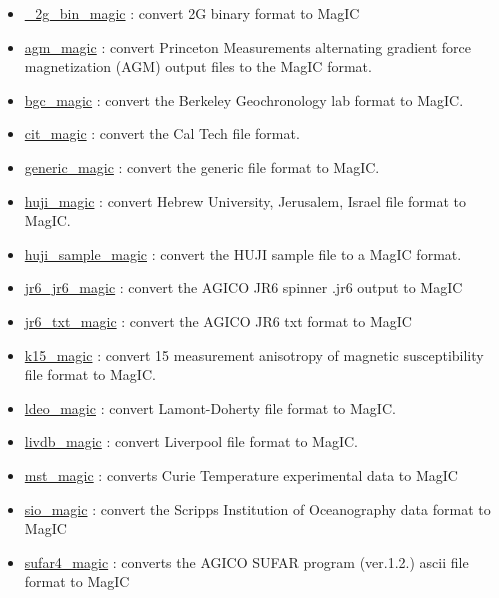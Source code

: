 \documentclass[11pt]{book}
\begin{document}
{{\begin{itemize}
\begin{itemize}
\item \href{http://pmagpy.github.io/PmagPy.html#_2g_bin_magic}{\_2g\_bin\_magic} : convert 2G binary format to MagIC
\item \href{http://pmagpy.github.io/PmagPy.html#agm_magic}{agm\_magic} : convert Princeton Measurements alternating gradient force magnetization (AGM) output files to the MagIC format.
\item \href{http://pmagpy.github.io/PmagPy.html#bgc_magic}{bgc\_magic} : convert the Berkeley Geochronology lab format to MagIC.
\item \href{http://pmagpy.github.io/PmagPy.html#cit_magic}{cit\_magic} : convert the Cal Tech file format.
\item \href{http://pmagpy.github.io/PmagPy.html#generic_magic}{generic\_magic} : convert the generic file format to MagIC.
\item \href{http://pmagpy.github.io/PmagPy.html#huji_magic}{huji\_magic} : convert Hebrew University, Jerusalem, Israel file format to MagIC.
\item \href{http://pmagpy.github.io/PmagPy.html#huji_sample_magic}{huji\_sample\_magic} : convert the HUJI sample file to a MagIC format.
\item \href{http://pmagpy.github.io/PmagPy.html#jr6_jr6}{jr6\_jr6\_magic} : convert the AGICO JR6 spinner .jr6 output to MagIC
\item \href{http://pmagpy.github.io/PmagPy.html#jr6_txt_magic}{jr6\_txt\_magic} : convert the AGICO JR6 txt format to MagIC
\item \href{http://pmagpy.github.io/PmagPy.html#k15_magic}{k15\_magic} : convert  15 measurement anisotropy of magnetic susceptibility file format to MagIC.
\item \href{http://pmagpy.github.io/PmagPy.html#ldeo_magic}{ldeo\_magic} : convert Lamont-Doherty file format to MagIC.
\item \href{http://pmagpy.github.io/PmagPy.html#livdb_magic}{livdb\_magic} : convert Liverpool file format to MagIC.
\item \href{http://pmagpy.github.io/PmagPy.html#mst_magic}{mst\_magic} : converts Curie Temperature experimental data to MagIC
\item \href{http://pmagpy.github.io/PmagPy.html#sio_magic}{sio\_magic} : convert the Scripps Institution of Oceanography data format to MagIC
\item \href{http://pmagpy.github.io/PmagPy.html#sufar4_magic}{sufar4\_magic} : converts the AGICO SUFAR program (ver.1.2.) ascii file format to MagIC

\end{itemize}
\end{itemize}}}
\end{document}
